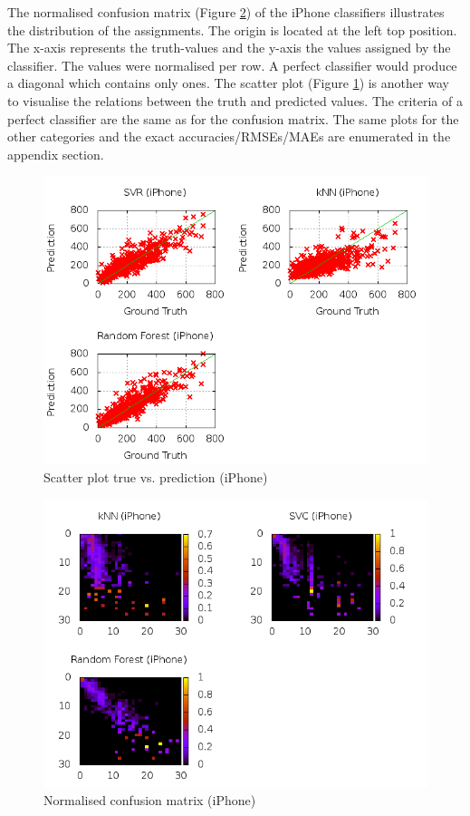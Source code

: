 The normalised confusion matrix (Figure \ref{conf_mat_iphone}) of the iPhone classifiers illustrates the distribution of the assignments. The origin is located at the left top position. The x-axis represents the truth-values and the y-axis the values assigned by the classifier. The values were normalised per row. A perfect classifier would produce a diagonal which contains only ones. 
The scatter plot (Figure \ref{true_predict_iphone}) is another way to visualise the relations between the truth and predicted values. The criteria of a perfect classifier are the same as for the confusion matrix. 
The same plots for the other categories and the exact accuracies/RMSEs/MAEs are enumerated in the appendix section.
\begin{figure}
\centering
\includegraphics[scale=0.55]{images/plots/machine_learning/iphone/true_pred_iphone.png}
\caption{Scatter plot true vs. prediction (iPhone)}
\label{true_predict_iphone}
\end{figure}
\begin{figure}
\centering
\includegraphics[scale=0.55]{images/plots/machine_learning/iphone/conf_mat_iphone.png}
\caption{Normalised confusion matrix (iPhone)}
\label{conf_mat_iphone}
\end{figure}

